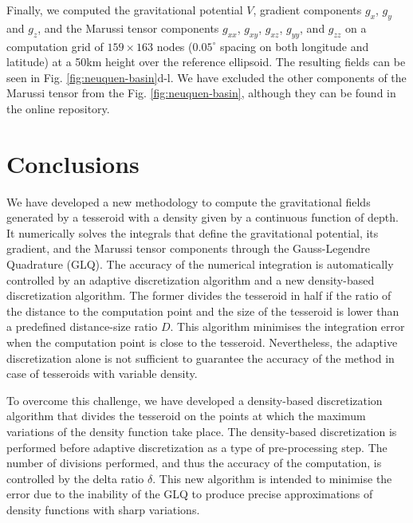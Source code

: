 \documentclass[extra]{gji}
\begin{document}
Finally, we computed the gravitational potential $V$, gradient components $g_x$,
$g_y$ and $g_z$, and the Marussi tensor components $g_{xx}$, $g_{xy}$,
$g_{xz}$, $g_{yy}$, and $g_{zz}$ on a computation grid of $159\times163$ nodes
($0.05^\circ$ spacing on both longitude and latitude) at a 50km height over the
reference ellipsoid.
The resulting fields can be seen in Fig.
\ref{fig:neuquen-basin}d-l.
We have excluded the other components of the Marussi tensor from the Fig.
\ref{fig:neuquen-basin},
although they can be found in the online repository.



\section{Conclusions}

We have developed a new methodology to compute the gravitational fields
generated by a tesseroid with a density given by a continuous function of depth.
It numerically solves the integrals that define the gravitational potential,
its gradient, and the Marussi tensor components through the Gauss-Legendre
Quadrature (GLQ).
The accuracy of the numerical integration is automatically controlled by an adaptive
discretization algorithm and a new density-based discretization algorithm.
The former divides the tesseroid in half if the ratio of the distance to the computation
point and the size of the tesseroid is lower than a predefined distance-size ratio $D$.
This algorithm minimises the integration error when the computation point is close to
the tesseroid.
Nevertheless, the adaptive discretization alone is not sufficient to guarantee the
accuracy of the method in case of tesseroids with variable density.

To overcome this challenge, we have developed a density-based discretization algorithm
that divides the tesseroid on the points at which the maximum variations of the density
function take place.
The density-based discretization is performed before adaptive discretization as a type
of pre-processing step.
The number of divisions performed, and thus the accuracy of the computation, is
controlled by the delta ratio $\delta$.
This new algorithm is intended to minimise the error due to the inability of
the GLQ to produce precise approximations of density functions with sharp variations.
\end{document}
